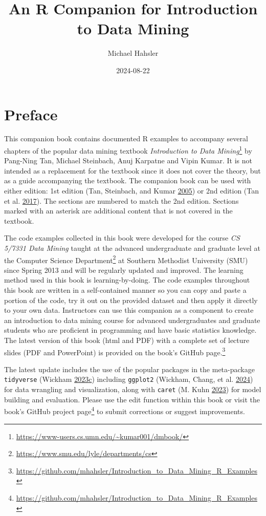 \documentclass[
  notitlepage]{book}
\title{An R Companion for Introduction to Data Mining}
\author{Michael Hahsler}
\date{2024-08-22}
\DeclareRobustCommand{\href}[2]{#2\footnote{\url{#1}}}
\begin{document}
\maketitle

{
\setcounter{tocdepth}{2}
\tableofcontents
}
\hypertarget{preface}{%
\chapter*{Preface}\label{preface}}

This companion book contains documented R examples to accompany several chapters
of the popular data mining textbook \href{https://www-users.cs.umn.edu/~kumar001/dmbook/}{\emph{Introduction to Data
Mining}} by Pang-Ning
Tan, Michael Steinbach, Anuj Karpatne and Vipin Kumar.
It is not intended as a replacement for the textbook since it does not cover the
theory, but as a guide accompanying the textbook.
The companion
book can be used with either edition: 1st edition (Tan, Steinbach, and Kumar \protect\hyperlink{ref-Tan2005}{2005}) or 2nd
edition (Tan et al. \protect\hyperlink{ref-Tan2018}{2017}). The sections are numbered to match the 2nd edition. Sections
marked with an asterisk are additional content that is not covered in
the textbook.

The code examples collected in this book were developed for the course
\emph{CS 5/7331 Data Mining} taught
at the advanced undergraduate and graduate level
at the \href{https://www.smu.edu/lyle/departments/cs}{Computer Science Department} at
Southern Methodist University (SMU) since Spring 2013 and will be regularly
updated and improved.
The learning method used in this book is learning-by-doing.
The code examples throughout this book are
written in a self-contained manner so you can copy and paste a portion of the code,
try it out on the provided dataset and then apply it directly to your own
data. Instructors can use this companion as a component to create an
introduction to data mining course for advanced undergraduates and graduate
students who are proficient in programming and have basic statistics knowledge.
The latest version of this book (html and PDF)
with a complete set of lecture slides (PDF and PowerPoint)
is provided on the
\href{https://github.com/mhahsler/Introduction_to_Data_Mining_R_Examples}{book's GitHub page.}

The latest update includes the use of the popular
packages in the meta-package \texttt{tidyverse} (Wickham \protect\hyperlink{ref-R-tidyverse}{2023}\protect\hyperlink{ref-R-tidyverse}{c}) including
\texttt{ggplot2} (Wickham, Chang, et al. \protect\hyperlink{ref-R-ggplot2}{2024}) for data wrangling and visualization, along with
\texttt{caret} (M. Kuhn \protect\hyperlink{ref-R-caret}{2023}) for model building and evaluation.
Please use the edit function within this book or visit the \href{https://github.com/mhahsler/Introduction_to_Data_Mining_R_Examples}{book's
GitHub project
page}
to submit corrections or suggest improvements.
\end{document}
